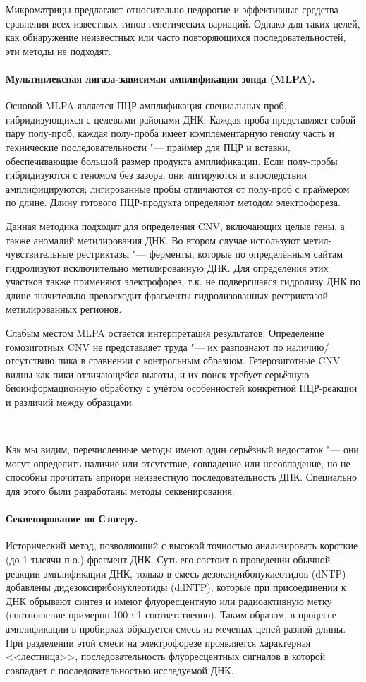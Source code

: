 \documentclass[a4paper,12pt]{article}
\begin{document}
Микроматрицы предлагают относительно недорогие и эффективные средства сравнения всех известных типов генетических вариаций.
Однако для таких целей, как обнаружение неизвестных или часто повторяющихся последовательностей, эти методы не подходят\cite{gresham}.

\paragraph{Мультиплексная лигаза-зависимая амплификация зонда (MLPA).}
Основой MLPA является ПЦР-амплификация специальных проб, гибридизующихся с целевыми районами ДНК.
Каждая проба представляет собой пару полу-проб;
каждая полу-проба имеет комплементарную геному часть и технические последовательности "--- праймер для ПЦР и вставки, обеспечивающие большой размер продукта амплификации.
Если полу-пробы гибридизуются с геномом без зазора, они лигируются и впоследствии амплифицируются;
лигированные пробы отличаются от полу-проб с праймером по длине.
Длину готового ПЦР-продукта определяют методом электрофореза.

Данная методика подходит для определения CNV, включающих целые гены, а также аномалий метилирования ДНК.
Во втором случае используют метил-чувствительные рестриктазы "--- ферменты, которые по определённым сайтам гидролизуют исключительно метилированную ДНК.
Для определения этих участков также применяют электрофорез, т.к. не подвергшаяся гидролизу ДНК по длине значительно превосходит фрагменты гидролизованных рестриктазой метилированных регионов.

Слабым местом MLPA остаётся интерпретация результатов.
Определение гомозиготных CNV не представляет труда "--- их разпознают по наличию/отсутствию пика в сравнении с контрольным образцом.
Гетерозиготные CNV видны как пики отличающейся высоты, и их поиск требует серьёзную биоинформационную обработку с учётом особенностей конкретной ПЦР-реакции и различий между образцами\cite{stuppia}.

~

Как мы видим, перечисленные методы имеют один серьёзный недостаток "--- они могут определить наличие или отсутствие, совпадение или несовпадение, но не способны прочитать априори неизвестную последовательность ДНК.
Специально для этого были разработаны методы секвенирования.

\paragraph{Секвенирование по Сэнгеру.}
Исторический метод, позволяющий с высокой точностью анализировать короткие (до 1 тысячи п.о.) фрагмент ДНК\cite{sanger}.
Суть его состоит в проведении обычной реакции амплификации ДНК, только в смесь дезоксирибонуклеотидов (dNTP) добавлены дидезоксирибонуклеотиды (ddNTP), которые при присоединении к ДНК обрывают синтез и имеют флуоресцентную или радиоактивную метку (соотношение примерно 100 : 1 соответственно).
Таким образом, в процессе амплификации в пробирках образуется смесь из меченых цепей разной длины.
При разделении этой смеси на электрофорезе проявляется характерная <<лестница>>, последовательность флуоресцентных сигналов в которой совпадает с последовательностью исследуемой ДНК.
\end{document}
